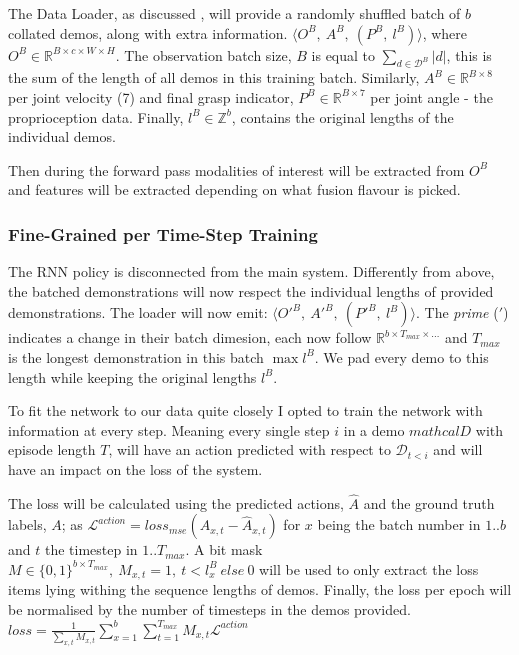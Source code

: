 The Data Loader, as discussed , will provide a randomly shuffled batch of $b$ collated demos, along with extra information. \( \langle O^B, ~A^B, ~\left( P^B, ~l^B \right) \rangle\), where \(O^B \in \mathbb{R}^{ B \times c \times W \times H}\). The observation batch size, $B$ is equal to \({\sum_{ d \in \mathcal{D}^B}|d|}\), this is the sum of the length of all demos in this training batch. Similarly, \(A^B \in \mathbb{R}^{B \times 8}\) per joint velocity (7) and final grasp indicator, \(P^B \in \mathbb{R}^{B \times 7}\) per joint angle - the proprioception data. Finally, \(l^B \in \mathbb{Z}^{b}\), contains the original lengths of the individual demos.

Then during the forward pass modalities of interest will be extracted from $O^B$ and features will be extracted depending on what fusion flavour is picked.



\subsubsection{Fine-Grained per Time-Step Training}
The RNN policy is disconnected from the main system. Differently from above, the batched demonstrations will now respect the individual lengths of provided demonstrations. The loader will now emit: \( \langle {O'}^B, ~{A'}^B, ~\left( {P'}^B, ~l^B \right) \rangle\). The \emph{prime} ($'$) indicates a change in their batch dimesion, each now follow $\mathbb{R}^{b \times T_{max} \times \ldots}$ and  $T_{max}$ is the longest demonstration in this batch \(\max l^{B}\). We pad every demo to this length while keeping the original lengths $l^{B}$.

To fit the network to our data quite closely I opted to train the network with information at every step. Meaning every single step $i$ in a demo $mathcal{D}$ with episode length $T$, will have an action predicted with respect to $\mathcal{D}_{t < i}$ and will have an impact on the loss of the system. 

The loss will be calculated using the predicted actions, $\hat{A}$ and the ground truth labels, $A$; as \( \mathcal{L}^{action} = {loss}_{mse}\left(A_{x, t} - \hat{A}_{x, t}\right)\) for $x$ being the batch number in $1..b$ and $t$ the timestep in $1..T_{max}$. A bit mask \(M \in \{0, 1\}^{b \times T_{max}}, ~M_{x, t} = 1, ~t < l^B_x ~else ~0\) will be used to only extract the loss items lying withing the sequence lengths of demos. Finally, the loss per epoch will be normalised by the number of timesteps in the demos provided. \(loss = \frac{1}{\sum_{x, t}M_{x, t}}{\sum_{x = 1}^{b}\sum_{t = 1}^{T_{max}}M_{x, t} \mathcal{L}^{action}}\)

